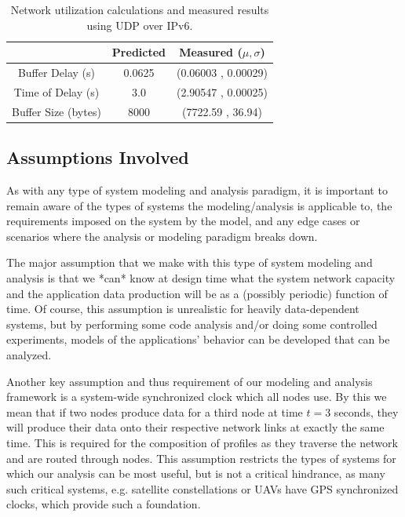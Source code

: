 \begin{table}[htbp]
\caption{Network utilization calculations and measured results using UDP over IPv6.}
\begin{tabular}{| c | c | c |}
\hline
 & Predicted & Measured ($\mu,\sigma$) \\\hline
Buffer Delay (s) & 0.0625 & (0.06003 , 0.00029) \\\hline
Time of Delay (s) & 3.0 & (2.90547 , 0.00025) \\\hline
Buffer Size (bytes) & 8000 & (7722.59 , 36.94) \\\hline
\end{tabular}
\label{table:results}
\end{table}

\subsection{Assumptions Involved}
\label{subsec:assumptions}

As with any type of system modeling and analysis paradigm, it is
important to remain aware of the types of systems the
modeling/analysis is applicable to, the requirements imposed on the
system by the model, and any edge cases or scenarios where the
analysis or modeling paradigm breaks down.

The major assumption that we make with this type of system modeling
and analysis is that we *can* know at design time what the system
network capacity and the application data production will be as a
(possibly periodic) function of time.  Of course, this assumption is
unrealistic for heavily data-dependent systems, but by performing some
code analysis and/or doing some controlled experiments, models of the
applications' behavior can be developed that can be analyzed.

Another key assumption and thus requirement of our modeling and
analysis framework is a system-wide synchronized clock which all nodes
use.  By this we mean that if two nodes produce data for a third node
at time $t=3$ seconds, they will produce their data onto their
respective network links at exactly the same time.  This is required
for the composition of profiles as they traverse the network and are
routed through nodes.  This assumption restricts the types of systems
for which our analysis can be most useful, but is not a critical
hindrance, as many such critical systems, e.g. satellite
constellations or UAVs have GPS synchronized clocks, which provide
such a foundation.

